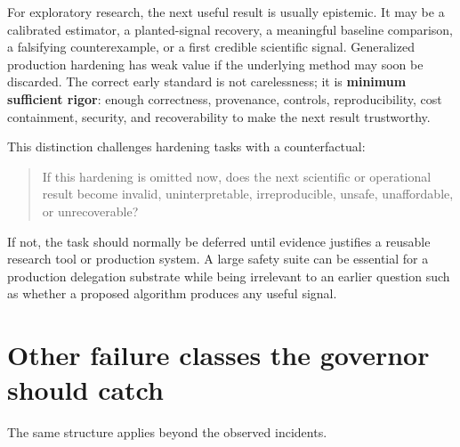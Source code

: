 \documentclass[11pt,letterpaper]{article}
\newcommand{\term}[1]{\textbf{#1}}
\begin{document}
For exploratory research, the next useful result is usually epistemic. It may
be a calibrated estimator, a planted-signal recovery, a meaningful baseline
comparison, a falsifying counterexample, or a first credible scientific
signal. Generalized production hardening has weak value if the underlying
method may soon be discarded. The correct early standard is not carelessness;
it is \term{minimum sufficient rigor}: enough correctness, provenance,
controls, reproducibility, cost containment, security, and recoverability to
make the next result trustworthy.

This distinction challenges hardening tasks with a counterfactual:

\begin{quote}
If this hardening is omitted now, does the next scientific or operational
result become invalid, uninterpretable, irreproducible, unsafe, unaffordable,
or unrecoverable?
\end{quote}

If not, the task should normally be deferred until evidence justifies a
reusable research tool or production system. A large safety suite can be
essential for a production delegation substrate while being irrelevant to an
earlier question such as whether a proposed algorithm produces any useful
signal.

\section{Other failure classes the governor should catch}

The same structure applies beyond the observed incidents.
\end{document}
